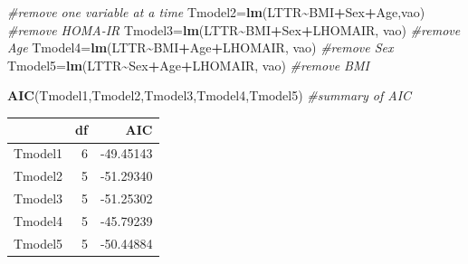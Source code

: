 \documentclass[
]{article}
\newenvironment{Shaded}{\begin{snugshade}}{\end{snugshade}}
\newcommand{\CommentTok}[1]{\textcolor[rgb]{0.56,0.35,0.01}{\textit{#1}}}
\newcommand{\FunctionTok}[1]{\textcolor[rgb]{0.13,0.29,0.53}{\textbf{#1}}}
\newcommand{\NormalTok}[1]{#1}
\newcommand{\OtherTok}[1]{\textcolor[rgb]{0.56,0.35,0.01}{#1}}
\newcommand{\SpecialCharTok}[1]{\textcolor[rgb]{0.81,0.36,0.00}{\textbf{#1}}}
\begin{document}
\begin{Shaded}
\begin{Highlighting}[]
\CommentTok{\#remove one variable at a time}
\NormalTok{Tmodel2}\OtherTok{=}\FunctionTok{lm}\NormalTok{(LTTR}\SpecialCharTok{\textasciitilde{}}\NormalTok{BMI}\SpecialCharTok{+}\NormalTok{Sex}\SpecialCharTok{+}\NormalTok{Age,vao) }\CommentTok{\#remove HOMA{-}IR}
\NormalTok{Tmodel3}\OtherTok{=}\FunctionTok{lm}\NormalTok{(LTTR}\SpecialCharTok{\textasciitilde{}}\NormalTok{BMI}\SpecialCharTok{+}\NormalTok{Sex}\SpecialCharTok{+}\NormalTok{LHOMAIR, vao) }\CommentTok{\#remove Age}
\NormalTok{Tmodel4}\OtherTok{=}\FunctionTok{lm}\NormalTok{(LTTR}\SpecialCharTok{\textasciitilde{}}\NormalTok{BMI}\SpecialCharTok{+}\NormalTok{Age}\SpecialCharTok{+}\NormalTok{LHOMAIR, vao) }\CommentTok{\#remove Sex}
\NormalTok{Tmodel5}\OtherTok{=}\FunctionTok{lm}\NormalTok{(LTTR}\SpecialCharTok{\textasciitilde{}}\NormalTok{Sex}\SpecialCharTok{+}\NormalTok{Age}\SpecialCharTok{+}\NormalTok{LHOMAIR, vao) }\CommentTok{\#remove BMI}

\FunctionTok{AIC}\NormalTok{(Tmodel1,Tmodel2,Tmodel3,Tmodel4,Tmodel5) }\CommentTok{\#summary of AIC}
\end{Highlighting}
\end{Shaded}

\begin{longtable}[]{@{}lrr@{}}
\toprule\noalign{}
& df & AIC \\
\midrule\noalign{}
\endhead
\bottomrule\noalign{}
\endlastfoot
Tmodel1 & 6 & -49.45143 \\
Tmodel2 & 5 & -51.29340 \\
Tmodel3 & 5 & -51.25302 \\
Tmodel4 & 5 & -45.79239 \\
Tmodel5 & 5 & -50.44884 \\
\end{longtable}
\end{document}

